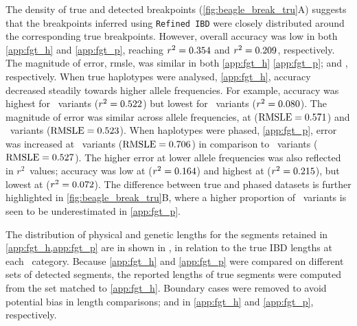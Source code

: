 The density of true and detected breakpoints (\cref{fig:beagle_break_tru}{A}) suggests that the breakpoints inferred using \texttt{Refined\,IBD} were closely distributed around the corresponding true breakpoints.
However, overall accuracy was low in both \ref{app:fgt_h} and \ref{app:fgt_p}, reaching
${r^2 = \dec{0.3539768}}$ and
${r^2 = \dec{0.2092084}}$, respectively.
The magnitude of error, \gls{rmsle}, was similar in both \ref{app:fgt_h} \ref{app:fgt_p};
 and
, respectively.
When true haplotypes were analysed, \cref{app:fgt_h}, accuracy decreased steadily towards higher allele frequencies.
For example, accuracy was highest for ~variants
(${r^2 = \dec{0.52206694}}$) but lowest for ~variants
(${r^2 = \dec{0.08020972}}$).
The magnitude of error was similar across allele frequencies, \eg at 
(${\rmsle = \dec{0.5713065}}$) and ~variants
(${\rmsle = \dec{0.5226131}}$).
When haplotypes were phased, \cref{app:fgt_p}, error was increased at ~variants
(${\rmsle = \dec{0.7062560}}$) in comparison to ~variants
(${\rmsle = \dec{0.5268743}}$).
The higher error at lower allele frequencies was also reflected in $r^2$~values; \eg accuracy was low at 
(${r^2 = \dec{0.16387089}}$) and highest at 
(${r^2 = \dec{0.21495542}}$), but lowest at 
(${r^2 = \dec{0.07223534}}$).
The difference between true and phased datasets is further highlighted in  \cref{fig:beagle_break_tru}{B}, where a higher proportion of ~variants is seen to be underestimated in \cref{app:fgt_p}.


%

%


The distribution of physical and genetic lengths for the segments retained in \cref{app:fgt_h,app:fgt_p} are in shown in , in relation to the true IBD lengths at each \fk{}~category.
Because \ref{app:fgt_h} and \ref{app:fgt_p} were compared on different sets of detected segments, the reported lengths of true segments were computed from the set matched to \ref{app:fgt_h}.
Boundary cases were removed to avoid potential bias in length comparisons;
 and
 in \ref{app:fgt_h} and \ref{app:fgt_p}, respectively.

